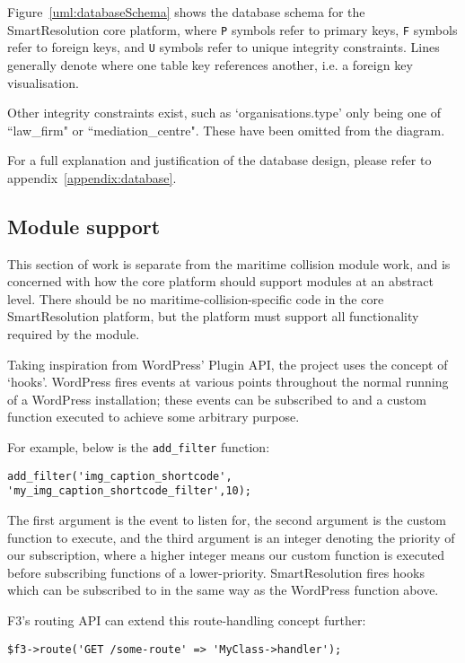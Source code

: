 Figure~\ref{uml:databaseSchema} shows the database schema for the SmartResolution core platform, where \lstinline{P} symbols refer to primary keys, \lstinline{F} symbols refer to foreign keys, and \lstinline{U} symbols refer to unique integrity constraints. Lines generally denote where one table key references another, i.e. a foreign key visualisation.

Other integrity constraints exist, such as `organisations.type' only being one of ``law\_firm" or ``mediation\_centre". These have been omitted from the diagram.

For a full explanation and justification of the database design, please refer to appendix~\ref{appendix:database}.

\subsection{Module support}

This section of work is separate from the maritime collision module work, and is concerned with how the core platform should support modules at an abstract level. There should be no maritime-collision-specific code in the core SmartResolution platform, but the platform must support all functionality required by the module.

Taking inspiration from WordPress' Plugin API, the project uses the concept of `hooks'. WordPress fires events at various points throughout the normal running of a WordPress installation; these events can be subscribed to and a custom function executed to achieve some arbitrary purpose.

For example, below is the \lstinline{add_filter} function: 

\begin{lstlisting}
add_filter('img_caption_shortcode', 'my_img_caption_shortcode_filter',10);
\end{lstlisting}

The first argument is the event to listen for, the second argument is the custom function to execute, and the third argument is an integer denoting the priority of our subscription, where a higher integer means our custom function is executed before subscribing functions of a lower-priority. SmartResolution fires hooks which can be subscribed to in the same way as the WordPress function above.

F3's routing API can extend this route-handling concept further:~\cite{f3:routing}

\begin{lstlisting}
$f3->route('GET /some-route' => 'MyClass->handler');
\end{lstlisting}

